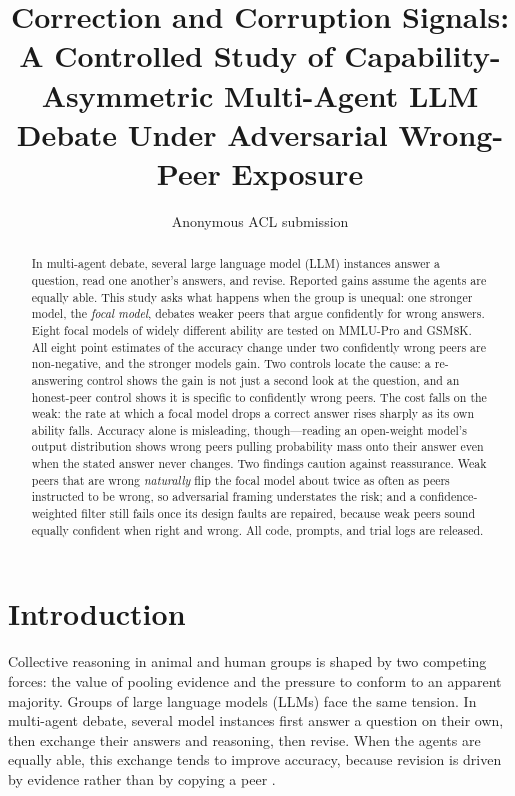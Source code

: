 \documentclass[11pt]{article}
\title{Correction and Corruption Signals: A Controlled Study of
Capability-Asymmetric Multi-Agent LLM Debate Under Adversarial
Wrong-Peer Exposure}
\author{Anonymous ACL submission}
\begin{document}
\maketitle

\begin{abstract}
In multi-agent debate, several large language model (LLM) instances
answer a question, read one another's answers, and revise.
Reported gains assume the agents are equally able.
This study asks what happens when the group is unequal: one stronger
model, the \textit{focal model}, debates weaker peers that argue
confidently for wrong answers.
Eight focal models of widely different ability are tested on MMLU-Pro and
GSM8K.
All eight point estimates of the accuracy change under two confidently wrong
peers are non-negative, and the stronger models gain.
Two controls locate the cause: a re-answering control shows the gain is not
just a second look at the question, and an honest-peer control shows it is
specific to confidently wrong peers.
The cost falls on the weak: the rate at which a focal model drops a correct
answer rises sharply as its own ability falls.
Accuracy alone is misleading, though---reading an open-weight model's output
distribution shows wrong peers pulling probability mass onto their answer even
when the stated answer never changes.
Two findings caution against reassurance.
Weak peers that are wrong \emph{naturally} flip the focal model about twice as
often as peers instructed to be wrong, so adversarial framing understates the
risk; and a confidence-weighted filter still fails once its design faults are
repaired, because weak peers sound equally confident when right and wrong.
All code, prompts, and trial logs are released.
\end{abstract}

\section{Introduction}
\label{sec:intro}

Collective reasoning in animal and human groups is shaped by two competing
forces: the value of pooling evidence and the pressure to conform to an
apparent majority.
Groups of large language models (LLMs) face the same tension.
In multi-agent debate, several model instances first answer a question on
their own, then exchange their answers and reasoning, then revise.
When the agents are equally able, this exchange tends to improve accuracy,
because revision is driven by evidence rather than by copying a peer
\citep{du2023improving}.
\end{document}
